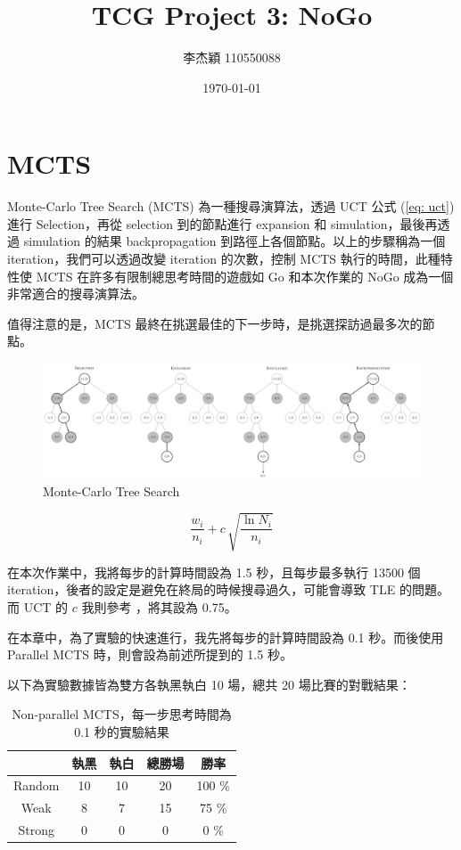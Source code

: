 \documentclass{article}[12pt]
\title{TCG Project 3: NoGo}
\author{李杰穎 110550088}
\date{\today}
\begin{document}
\maketitle



\section{MCTS}

Monte-Carlo Tree Search (MCTS) 為一種搜尋演算法，透過 UCT 公式 (\autoref{eq: uct}) 進行 Selection，再從 selection 到的節點進行 expansion 和 simulation，最後再透過 simulation 的結果 backpropagation 到路徑上各個節點。以上的步驟稱為一個 iteration，我們可以透過改變 iteration 的次數，控制 MCTS 執行的時間，此種特性使 MCTS 在許多有限制總思考時間的遊戲如 Go 和本次作業的 NoGo 成為一個非常適合的搜尋演算法。

值得注意的是，MCTS 最終在挑選最佳的下一步時，是挑選探訪過最多次的節點。

\begin{figure}[H]
\centering
\includegraphics[width=0.7\linewidth]{"img/mcts"}
\caption{Monte-Carlo Tree Search}
\label{fig:mcts}
\end{figure}

\begin{equation}
\frac{w_i}{n_i}+c\,\sqrt{\frac{\ln N_i}{n_i}}
\label{eq: uct}
\end{equation}

在本次作業中，我將每步的計算時間設為 1.5 秒，且每步最多執行 13500 個 iteration，後者的設定是避免在終局的時候搜尋過久，可能會導致 TLE 的問題。而 UCT 的 $c$ 我則參考 \cite{She2013}，將其設為 0.75。

在本章中，為了實驗的快速進行，我先將每步的計算時間設為 0.1 秒。而後使用 Parallel MCTS 時，則會設為前述所提到的 1.5 秒。

以下為實驗數據皆為雙方各執黑執白 10 場，總共 20 場比賽的對戰結果：

\begin{table}[H]
\centering
\caption{Non-parallel MCTS，每一步思考時間為 0.1 秒的實驗結果}
\label{tab:mcts-1}
\begin{tabular}{@{}ccccc@{}}
\toprule
       & 執黑 & 執白 & 總勝場 & 勝率     \\ \midrule
Random & 10 & 10 & 20  & 100 \% \\
Weak   & 8  & 7  & 15  & 75 \%  \\
Strong & 0  & 0  & 0   & 0 \%   \\ \bottomrule
\end{tabular}
\end{table}
\end{document}
